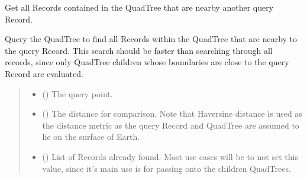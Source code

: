 \documentclass[letterpaper,10pt,english]{sphinxmanual}
\begin{document}
\begin{fulllineitems}
\begin{fulllineitems}
\begin{quote}
\begin{description}
\end{description}\end{quote}

\end{fulllineitems}


\begin{fulllineitems}
\label{\detokenize{quadtree:geotrees.quadtree.QuadTree.nearby_points}}
\pysigstartsignatures
\pysiglinewithargsret
{}
{\sphinxparamcomma {}\sphinxparamcomma {}\sphinxparamcomma {}}
{}
\pysigstopsignatures
\sphinxAtStartPar
Get all Records contained in the QuadTree that are nearby
another query Record.

\sphinxAtStartPar
Query the QuadTree to find all Records within the QuadTree that
are nearby to the query Record. This search should be faster
than searching through all records, since only QuadTree children whose
boundaries are close to the query Record are evaluated.
\begin{quote}\begin{description}
\begin{itemize}
\item {}
\sphinxAtStartPar
{} ({\hyperref[\detokenize{record:geotrees.record.Record}]{}}) \textendash{} The query point.

\item {}
\sphinxAtStartPar
{} () \textendash{} The distance for comparison. Note that Haversine distance is used
as the distance metric as the query Record and QuadTree are
assumed to lie on the surface of Earth.

\item {}
\sphinxAtStartPar
{} (\sphinxstyleliteralemphasis{\sphinxupquote{ | }}) \textendash{} List of Records already found. Most use cases will be to
not set this value, since it’s main use is for passing onto the
children QuadTrees.


\end{itemize}
\end{description}
\end{quote}
\end{fulllineitems}
\end{fulllineitems}
\end{document}
